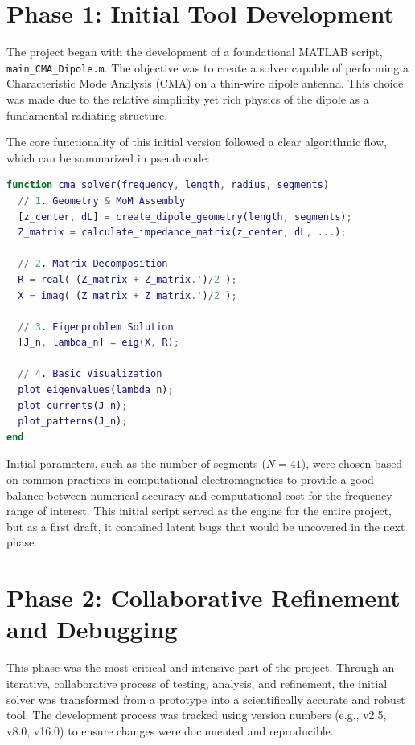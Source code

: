 \documentclass[11pt, a4paper]{article}
\begin{document}
\newpage

\section{Phase 1: Initial Tool Development}

The project began with the development of a foundational MATLAB script, \texttt{main\_CMA\_Dipole.m}. The objective was to create a solver capable of performing a Characteristic Mode Analysis (CMA) on a thin-wire dipole antenna. This choice was made due to the relative simplicity yet rich physics of the dipole as a fundamental radiating structure.

The core functionality of this initial version followed a clear algorithmic flow, which can be summarized in pseudocode:

\begin{lstlisting}[language=Matlab, caption={Pseudocode for the initial CMA solver logic.}, label={lst:pseudo1}]
function cma_solver(frequency, length, radius, segments)
  // 1. Geometry & MoM Assembly
  [z_center, dL] = create_dipole_geometry(length, segments);
  Z_matrix = calculate_impedance_matrix(z_center, dL, ...);

  // 2. Matrix Decomposition
  R = real( (Z_matrix + Z_matrix.')/2 );
  X = imag( (Z_matrix + Z_matrix.')/2 );

  // 3. Eigenproblem Solution
  [J_n, lambda_n] = eig(X, R);

  // 4. Basic Visualization
  plot_eigenvalues(lambda_n);
  plot_currents(J_n);
  plot_patterns(J_n);
end
\end{lstlisting}

Initial parameters, such as the number of segments ($N=41$), were chosen based on common practices in computational electromagnetics to provide a good balance between numerical accuracy and computational cost for the frequency range of interest. This initial script served as the engine for the entire project, but as a first draft, it contained latent bugs that would be uncovered in the next phase.

\section{Phase 2: Collaborative Refinement and Debugging}

This phase was the most critical and intensive part of the project. Through an iterative, collaborative process of testing, analysis, and refinement, the initial solver was transformed from a prototype into a scientifically accurate and robust tool. The development process was tracked using version numbers (e.g., v2.5, v8.0, v16.0) to ensure changes were documented and reproducible.
\end{document}
